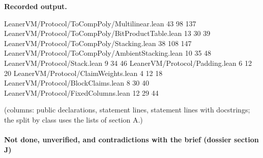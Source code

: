 \textbf{Recorded output.}

\begin{srccode}
LeanerVM/Protocol/ToCompPoly/Multilinear.lean 43 98 137
LeanerVM/Protocol/ToCompPoly/BitProductTable.lean 13 30 39
LeanerVM/Protocol/ToCompPoly/Stacking.lean 38 108 147
LeanerVM/Protocol/ToCompPoly/AmbientStacking.lean 10 35 48
LeanerVM/Protocol/Stack.lean 9 34 46
LeanerVM/Protocol/Padding.lean 6 12 20
LeanerVM/Protocol/ClaimWeights.lean 4 12 18
LeanerVM/Protocol/BlockClaims.lean 8 30 40
LeanerVM/Protocol/FixedColumns.lean 12 29 44
\end{srccode}

(columns: public declarations, statement lines, statement lines with docstrings; the split by class uses the lists of section A.)

\paragraph{Not done, unverified, and contradictions with the brief (dossier section J)}\label{sec:gen-layer1-J}

